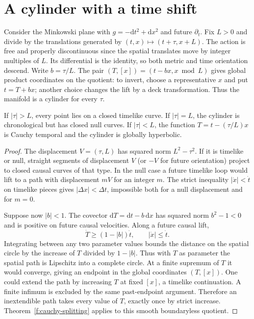 \section{A cylinder with a time shift}

Consider the Minkowski plane with $g=-\mathrm dt^2+\mathrm dx^2$ and future $\partial_t$. Fix $L>0$ and divide by the translations generated by $(t,x)\mapsto(t+\tau,x+L)$. The action is free and properly discontinuous since the spatial translates move by integer multiples of $L$. Its differential is the identity, so both metric and time orientation descend. Write $b=\tau/L$. The pair $(T,[x])=(t-bx,x\bmod L)$ gives global product coordinates on the quotient: to invert, choose a representative $x$ and put $t=T+bx$; another choice changes the lift by a deck transformation. Thus the manifold is a cylinder for every $\tau$.

\begin{theorem}\label{f:shift-cylinder}
If $|\tau|>L$, every point lies on a closed timelike curve. If $|\tau|=L$, the cylinder is chronological but has closed null curves. If $|\tau|<L$, the function $T=t-(\tau/L)x$ is Cauchy temporal and the cylinder is globally hyperbolic.
\end{theorem}
\begin{proof}
The displacement $V=(\tau,L)$ has squared norm $L^2-\tau^2$. If it is timelike or null, straight segments of displacement $V$ (or $-V$ for future orientation) project to closed causal curves of that type. In the null case a future timelike loop would lift to a path with displacement $mV$ for an integer $m$. The strict inequality $|\dot x|<\dot t$ on timelike pieces gives $|\Delta x|<\Delta t$, impossible both for a null displacement and for $m=0$.

Suppose now $|b|<1$. The covector $\mathrm dT=\mathrm dt-b\,\mathrm dx$ has squared norm $b^2-1<0$ and is positive on future causal velocities. Along a future causal lift,
\[
 \dot T\geq(1-|b|)\dot t,\qquad |\dot x|\leq\dot t .
\]
Integrating between any two parameter values bounds the distance on the spatial circle by the increase of $T$ divided by $1-|b|$. Thus with $T$ as parameter the spatial path is Lipschitz into a complete circle. At a finite supremum of $T$ it would converge, giving an endpoint in the global coordinates $(T,[x])$. One could extend the path by increasing $T$ at fixed $[x]$, a timelike continuation. A finite infimum is excluded by the same past-endpoint argument. Therefore an inextendible path takes every value of $T$, exactly once by strict increase. Theorem~\ref{f:cauchy-splitting} applies to this smooth boundaryless quotient.
\end{proof}

